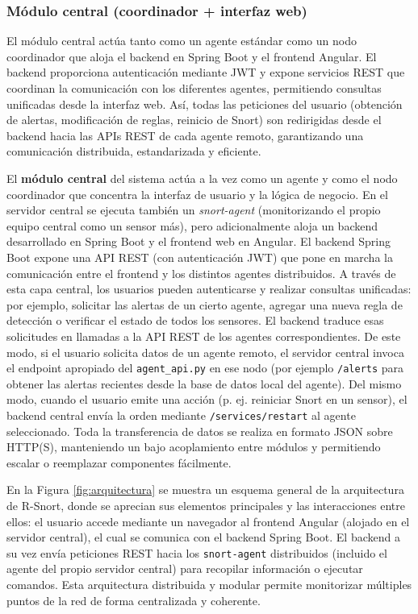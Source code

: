 \documentclass[11pt,a4paper,twoside]{report}
\begin{document}
\subsubsection{Módulo central (coordinador + interfaz web)}

El módulo central actúa tanto como un agente estándar como un nodo coordinador que aloja el backend en Spring Boot y el frontend Angular. El backend proporciona autenticación mediante JWT y expone servicios REST que coordinan la comunicación con los diferentes agentes, permitiendo consultas unificadas desde la interfaz web. Así, todas las peticiones del usuario (obtención de alertas, modificación de reglas, reinicio de Snort) son redirigidas desde el backend hacia las APIs REST de cada agente remoto, garantizando una comunicación distribuida, estandarizada y eficiente. \newline

El \textbf{módulo central} del sistema actúa a la vez como un agente y como el nodo coordinador que concentra la interfaz de usuario y la lógica de negocio. En el servidor central se ejecuta también un \textit{snort-agent} (monitorizando el propio equipo central como un sensor más), pero adicionalmente aloja un backend desarrollado en Spring Boot y el frontend web en Angular. El backend Spring Boot expone una API REST (con autenticación JWT) que pone en marcha la comunicación entre el frontend y los distintos agentes distribuidos. A través de esta capa central, los usuarios pueden autenticarse y realizar consultas unificadas: por ejemplo, solicitar las alertas de un cierto agente, agregar una nueva regla de detección o verificar el estado de todos los sensores. El backend traduce esas solicitudes en llamadas a la API REST de los agentes correspondientes. De este modo, si el usuario solicita datos de un agente remoto, el servidor central invoca el endpoint apropiado del \texttt{agent\_api.py} en ese nodo (por ejemplo \texttt{/alerts} para obtener las alertas recientes desde la base de datos local del agente). Del mismo modo, cuando el usuario emite una acción (p. ej. reiniciar Snort en un sensor), el backend central envía la orden mediante \texttt{/services/restart} al agente seleccionado. Toda la transferencia de datos se realiza en formato JSON sobre HTTP(S), manteniendo un bajo acoplamiento entre módulos y permitiendo escalar o reemplazar componentes fácilmente.\newline

En la Figura \ref{fig:arquitectura} se muestra un esquema general de la arquitectura de R-Snort, donde se aprecian sus elementos principales y las interacciones entre ellos: el usuario accede mediante un navegador al frontend Angular (alojado en el servidor central), el cual se comunica con el backend Spring Boot. El backend a su vez envía peticiones REST hacia los \texttt{snort-agent} distribuidos (incluido el agente del propio servidor central) para recopilar información o ejecutar comandos. Esta arquitectura distribuida y modular permite monitorizar múltiples puntos de la red de forma centralizada y coherente.
\end{document}
